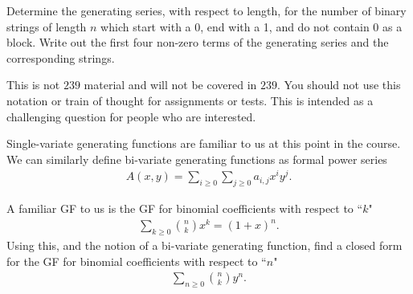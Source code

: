 \begin{enumerate}
     Determine the generating series, with respect to length, for the number of binary strings of length $n$ which start with a 0, end with a 1, and do not contain 0 as a block. Write out the first four non-zero terms of the generating series and the corresponding strings.


     This is not $239$ material and will not be covered in $239$. You should not use this notation or train of thought for assignments or tests. This is intended as a challenging question for people who are interested.
    
    Single-variate generating functions are familiar to us at this point in the course. We can similarly define bi-variate generating functions as formal power series
    \begin{align*}
        A(x,y) =  \sum_{i \geq 0} \sum_{j \geq 0} a_{i,j} x^i y^j.
    \end{align*}

    A familiar GF to us is the GF for binomial coefficients with respect to ``$k$"
    \begin{align*}
        \sum_{k \geq 0} \binom{n}{k} x^k = (1+x)^n.
    \end{align*}
    Using this, and the notion of a bi-variate generating function, find a closed form for the GF for binomial coefficients with respect to ``$n$"
    \begin{align*}
        \sum_{n \geq 0} \binom{n}{k} y^n.
    \end{align*}
    
\end{enumerate}